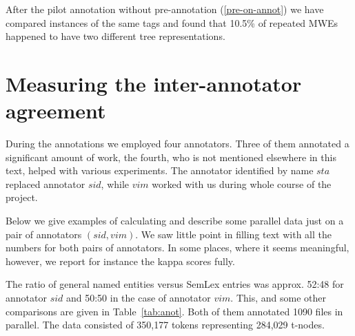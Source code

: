
After the pilot annotation without pre-annotation (\ref{pre-on-annot})  we have compared instances of the same tags and found that 10.5\% of repeated MWEs happened to have two different tree representations. 



\section{Measuring the inter-annotator agreement}
\label{sec:annot:analysis}
During the annotations we employed four annotators. Three of them annotated a significant amount of work, the fourth, who is not mentioned elsewhere in this text, helped with various experiments. The annotator identified by name $sta$ replaced annotator $sid$, while $vim$ worked with us during whole course of the project. 

Below we give examples of calculating and describe some parallel data just on a pair of annotators $(sid, vim)$. We saw little point in filling text with all the numbers for both pairs of annotators. In some places, where it seems meaningful, however, we report for instance the kappa scores fully.

The ratio of general named entities versus SemLex entries was approx. 52:48 for annotator $sid$ and 50:50 in the case of annotator $vim$. This, and some other comparisons are given in Table~\ref{tab:anot}. Both of them annotated 1090 files in parallel. The data consisted of  350,177 tokens representing 284,029 t-nodes.

